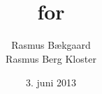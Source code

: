 \documentclass[oneside, 12pt]{memoir}
\title{\DocumentType \\ for \\ \ProjectName}
\date{3. juni 2013}
\author{Rasmus Bækgaard\\Rasmus Berg Kloster}
\begin{document}
\begin{titlingpage}
  \maketitle
\end{titlingpage}

\newpage
\tableofcontents*
\listoffixmes 










\end{document}

